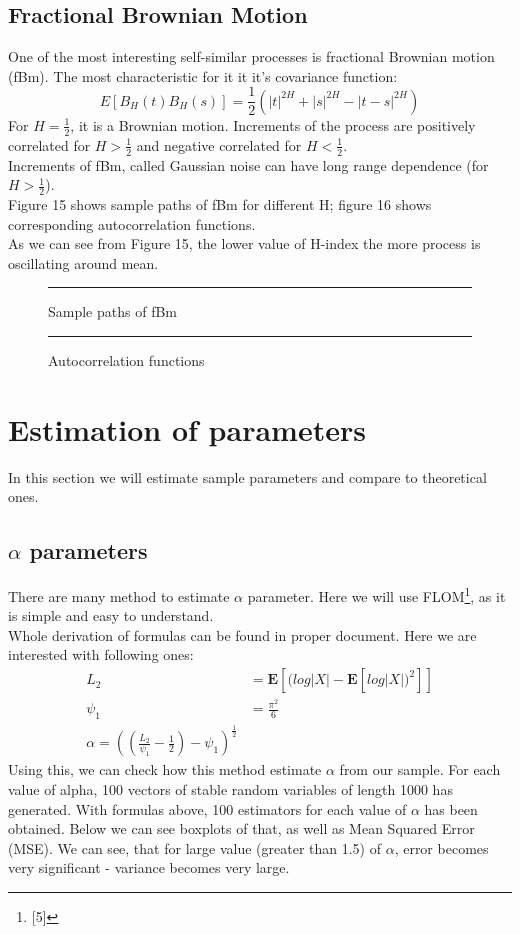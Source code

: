 \documentclass{article}
\newcommand\xput[2][0.5]{%
    \rule{#1\linewidth}{0pt}\makebox[0pt][c]{#2}\hfill}
\begin{document}
\subsection{Fractional Brownian Motion}
One of the most interesting self-similar processes is fractional Brownian motion (fBm). The most characteristic for it it it's covariance function:
\begin{equation*}
E[B_H(t)B_H(s)] = \frac{1}{2}(|t|^{2H} + |s|^{2H} - |t-s|^{2H})
\end{equation*}
For $H = \frac{1}{2}$, it is a Brownian motion. Increments of the process are positively correlated for $H > \frac{1}{2}$ and negative correlated for $H < \frac{1}{2}$.\\
Increments of fBm, called Gaussian noise can have long range dependence (for $H > \frac{1}{2}$).\\
Figure 15 shows sample paths of fBm for different H; figure 16 shows corresponding autocorrelation functions.\\
As we can see from Figure 15, the lower value of H-index the more process is oscillating around mean.
	\begin{figure}[h]
		\xput[0.5]{\texttt{[image: fbm2]}}
		
		\caption{Sample paths of fBm}
	\end{figure}
	
\begin{figure}[h]
		\xput[0.5]{\texttt{[image: autocorr]}}
		
		\caption{Autocorrelation functions}
\end{figure}
\clearpage

\section{Estimation of parameters}
In this section we will estimate sample parameters and compare to theoretical ones.
\subsection{$\alpha$ parameters}
There are many method to estimate $\alpha$ parameter. Here we will use FLOM\footnote{[5]}, as it is simple and easy to understand.\\
Whole derivation of formulas can be found in proper document. Here we are interested with following ones:
\begin{align*}
L_2 &= \mathbf{E} [(log|X| - \mathbf{E}[log|X|)^2] ] \\
\psi_1 &= \frac{\pi^2}{6} \\
\alpha = ( (\frac{L_2}{\psi_1} - \frac{1}{2}) - \psi_1)^{\frac{1}{2}}
\end{align*}
Using this, we can check how this method estimate $\alpha$ from our sample. For each value of alpha, 100 vectors of stable random variables of length 1000 has generated. With formulas above, 100 estimators for each value of $\alpha$ has been obtained. Below we can see boxplots of that, as well as Mean Squared Error (MSE). We can see, that for large value (greater than 1.5) of $\alpha$, error becomes very significant - variance becomes very large.
\end{document}
